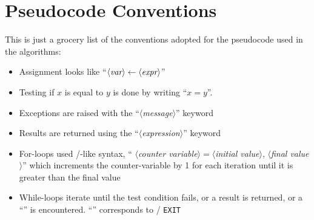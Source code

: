 \chapter{Pseudocode Conventions}

This is just a grocery list of the conventions adopted for the
pseudocode used in the algorithms:
\begin{itemize}
\item Assignment looks like ``$\langle\mbox{\it var}\rangle\gets\langle\mbox{\it expr}\rangle$''
\item Testing if $x$ is equal to $y$ is done by writing ``$x = y$''.
\item Exceptions are raised with the ``\Fail$\langle$\textit{message}$\rangle$'' keyword
\item Results are returned using the ``\Return$\langle$\textit{expression}$\rangle$'' keyword
\item For-loops used \FORTRAN/-like syntax, ``\algorithmicfor 
  $\langle$\textit{counter variable}$\rangle = \langle$\textit{initial
  value}$\rangle$, $\langle$\textit{final value}$\rangle$'' which
  increments the counter-variable by 1 for each iteration until it is
  greater than the final value
\item While-loops iterate until the test condition fails, or a result is
  returned, or a ``\Break'' is encountered. ``\Break'' corresponds to
  \FORTRAN/ \verb#EXIT#

\end{itemize}